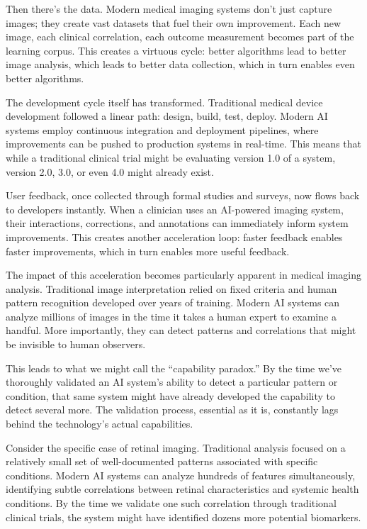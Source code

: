 \documentclass[
  Letterpaper,
]{scrbook}
\begin{document}
Then there's the data. Modern medical imaging systems don't just capture
images; they create vast datasets that fuel their own improvement. Each
new image, each clinical correlation, each outcome measurement becomes
part of the learning corpus. This creates a virtuous cycle: better
algorithms lead to better image analysis, which leads to better data
collection, which in turn enables even better algorithms.

The development cycle itself has transformed. Traditional medical device
development followed a linear path: design, build, test, deploy. Modern
AI systems employ continuous integration and deployment pipelines, where
improvements can be pushed to production systems in real-time. This
means that while a traditional clinical trial might be evaluating
version 1.0 of a system, version 2.0, 3.0, or even 4.0 might already
exist.

User feedback, once collected through formal studies and surveys, now
flows back to developers instantly. When a clinician uses an AI-powered
imaging system, their interactions, corrections, and annotations can
immediately inform system improvements. This creates another
acceleration loop: faster feedback enables faster improvements, which in
turn enables more useful feedback.

The impact of this acceleration becomes particularly apparent in medical
imaging analysis. Traditional image interpretation relied on fixed
criteria and human pattern recognition developed over years of training.
Modern AI systems can analyze millions of images in the time it takes a
human expert to examine a handful. More importantly, they can detect
patterns and correlations that might be invisible to human observers.

This leads to what we might call the ``capability paradox.'' By the time
we've thoroughly validated an AI system's ability to detect a particular
pattern or condition, that same system might have already developed the
capability to detect several more. The validation process, essential as
it is, constantly lags behind the technology's actual capabilities.

Consider the specific case of retinal imaging. Traditional analysis
focused on a relatively small set of well-documented patterns associated
with specific conditions. Modern AI systems can analyze hundreds of
features simultaneously, identifying subtle correlations between retinal
characteristics and systemic health conditions. By the time we validate
one such correlation through traditional clinical trials, the system
might have identified dozens more potential biomarkers.
\end{document}
